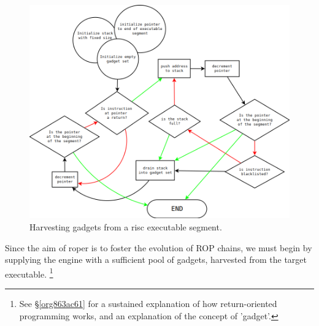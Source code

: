 \documentclass[12pt,glossary]{dalthesis}
\begin{document}
\begin{figure}[htbp]
\centering
\includegraphics[width=.9\linewidth]{../images/gadget-harvest-dark.png}
\caption{\label{fig:org93a37b1}
Harvesting gadgets from a \gls{risc} executable segment.}
\end{figure}

Since the aim of \gls{roper} is to foster the evolution of ROP chains, we 
must begin by supplying the engine with a sufficient pool of gadgets, 
harvested from the target executable. 
  \footnote{See \S \ref{org863ac61} for a sustained explanation of how return-oriented
  programming works, and an explanation of the concept of 'gadget'.}
\end{document}

